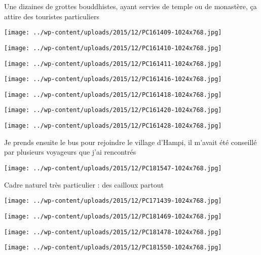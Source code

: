 Une dizaines de grottes bouddhistes, ayant servies de temple ou de monastère, ça attire des touristes particuliers 
\begin{center} \texttt{[image: ../wp-content/uploads/2015/12/PC161409-1024x768.jpg]} \end{center}
\begin{center} \texttt{[image: ../wp-content/uploads/2015/12/PC161410-1024x768.jpg]} \end{center}
\begin{center} \texttt{[image: ../wp-content/uploads/2015/12/PC161411-1024x768.jpg]} \end{center}
\begin{center} \texttt{[image: ../wp-content/uploads/2015/12/PC161416-1024x768.jpg]} \end{center}
\begin{center} \texttt{[image: ../wp-content/uploads/2015/12/PC161418-1024x768.jpg]} \end{center}
\begin{center} \texttt{[image: ../wp-content/uploads/2015/12/PC161420-1024x768.jpg]} \end{center}
\begin{center} \texttt{[image: ../wp-content/uploads/2015/12/PC161428-1024x768.jpg]} \end{center}
\pagebreak


Je prends ensuite le bus pour rejoindre le village d'Hampi, il m'avait été conseillé par plusieurs voyageurs que j'ai rencontrés 
\begin{center} \texttt{[image: ../wp-content/uploads/2015/12/PC181547-1024x768.jpg]} \end{center}

Cadre naturel très particulier : des cailloux partout 
\begin{center} \texttt{[image: ../wp-content/uploads/2015/12/PC171439-1024x768.jpg]} \end{center}
\begin{center} \texttt{[image: ../wp-content/uploads/2015/12/PC181469-1024x768.jpg]} \end{center}
\begin{center} \texttt{[image: ../wp-content/uploads/2015/12/PC181478-1024x768.jpg]} \end{center}
\begin{center} \texttt{[image: ../wp-content/uploads/2015/12/PC181550-1024x768.jpg]} \end{center}

